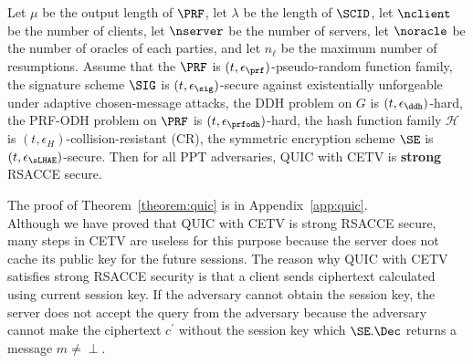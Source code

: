 \begin{theorem} \label{theorem:quic_cetv}
 Let $\mu$ be the output length of $\PRF$, let $\lambda$ be the length of $\SCID$, let $\nclient$ be the number of clients, let $\nserver$ be the number of servers, let $\noracle$ be the number of oracles of each parties, and let $n_{\ell}$ be the maximum number of resumptions. Assume that the $\PRF$ is $(t, \epsilon_{\prf})$-pseudo-random function family, the signature scheme $\SIG$ is $(t, \epsilon_{\sig})$-secure against existentially unforgeable under adaptive chosen-message attacks, the DDH problem on $G$ is $(t, \epsilon_{\ddh})$-hard, the PRF-ODH problem on $\PRF$ is $(t, \epsilon_{\prfodh})$-hard, the hash function family $\mathcal{H}$ is $(t,\epsilon_{H})$-collision-resistant (CR), the symmetric encryption scheme $\SE$ is $(t, \epsilon_{\sLHAE})$-secure.
 Then for all PPT adversaries, QUIC with CETV is \textbf{strong} RSACCE secure.
\end{theorem}

The proof of Theorem~\ref{theorem:quic} is in Appendix~\ref{app:quic}.\\

Although we have proved that QUIC with CETV is strong RSACCE secure, many steps in CETV are useless for this purpose because the server does not cache its public key for the future sessions. The reason why QUIC with CETV satisfies strong RSACCE security is that a client sends ciphertext calculated using current session key. If the adversary cannot obtain the session key, the server does not accept the query from the adversary because the adversary cannot make the ciphertext $c^{\prime}$ without the session key which $\SE.\Dec$ returns a message $m \neq \perp$.